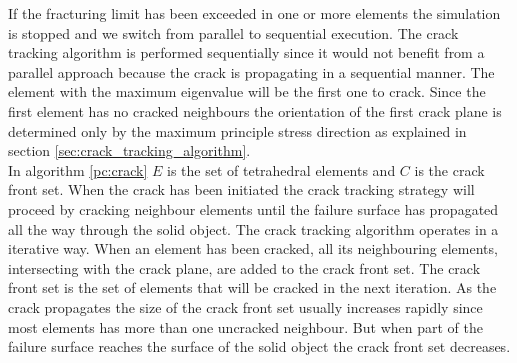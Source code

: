 If the fracturing limit has been exceeded in one or more elements the
simulation is stopped and we switch from parallel to sequential
execution. The crack tracking algorithm is performed sequentially
since it would not benefit from a parallel approach because the crack
is propagating in a sequential manner. The element with the maximum
eigenvalue will be the first one to crack. Since the first element has
no cracked neighbours the orientation of the first crack plane is  
determined only by the maximum principle stress direction as explained in
section \vref{sec:crack_tracking_algorithm}. \\

In algorithm \vref{pc:crack} $E$ is the set of tetrahedral elements and
$C$ is the
crack front set. When the crack has been initiated the crack tracking
strategy will proceed by cracking neighbour elements until the failure
surface has propagated all the way through the solid object. The crack
tracking algorithm operates in a iterative way. When an element has been
cracked, all its neighbouring elements, intersecting with the crack
plane, are added to the crack front set. The crack front set is the
set of elements that will be cracked in the next iteration. As the
crack propagates the size of the crack front set usually increases
rapidly since most elements has more than one uncracked neighbour. But
when part of the failure surface reaches the surface of the solid object the
crack front set decreases. \\ 

